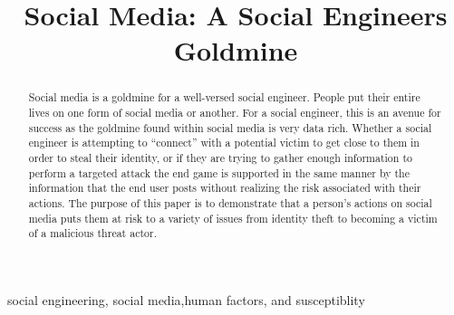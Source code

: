 \documentclass[conference]{IEEEtran}
\begin{document}
\title{Social Media: A Social Engineers Goldmine\\
{\footnotesize \textsuperscript{}}
}

\author{

}
\maketitle

\begin{abstract}
Social media is a goldmine for a well-versed social engineer. People put their entire lives on one form of social media or another. For a social engineer, this is an avenue for success as the goldmine found within social media is very data rich.  Whether a social engineer is attempting to “connect” with a potential victim to get close to them in order to steal their identity, or if they are trying to gather enough information to perform a targeted attack the end game is supported in the same manner by the information that the end user posts without realizing the risk associated with their actions.  The purpose of this paper is to demonstrate that a person’s actions on social media puts them at risk to a variety of issues from identity theft to becoming a victim of a malicious threat actor.  
\end{abstract}

\begin{IEEEkeywords}
social engineering, social media,human factors, and susceptiblity
\end{IEEEkeywords}
\end{document}
